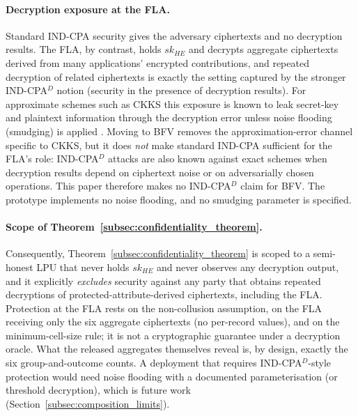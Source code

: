 \documentclass[a4paper,fleqn]{cas-dc}
\begin{document}
{\label{subsec:ind_cpa_d} \paragraph{Decryption exposure at the FLA.} Standard IND-CPA security gives the adversary ciphertexts and no decryption results. The FLA, by contrast, holds $sk_{HE}$ and decrypts aggregate ciphertexts derived from many applications' encrypted contributions, and repeated decryption of related ciphertexts is exactly the setting captured by the stronger IND-CPA$^{D}$ notion (security in the presence of decryption results). For approximate schemes such as CKKS this exposure is known to leak secret-key and plaintext information through the decryption error unless noise flooding (smudging) is applied \citep{limicciancio2021approximate}. Moving to BFV removes the approximation-error channel specific to CKKS, but it does \emph{not} make standard IND-CPA sufficient for the FLA's role: IND-CPA$^{D}$ attacks are also known against exact schemes when decryption results depend on ciphertext noise or on adversarially chosen operations. This paper therefore makes no IND-CPA$^{D}$ claim for BFV. The prototype implements no noise flooding, and no smudging parameter is specified.

\paragraph{Scope of Theorem~\ref{subsec:confidentiality_theorem}.} Consequently, Theorem~\ref{subsec:confidentiality_theorem} is scoped to a semi-honest LPU that never holds $sk_{HE}$ and never observes any decryption output, and it explicitly \emph{excludes} security against any party that obtains repeated decryptions of protected-attribute-derived ciphertexts, including the FLA. Protection at the FLA rests on the non-collusion assumption, on the FLA receiving only the six aggregate ciphertexts (no per-record values), and on the minimum-cell-size rule; it is not a cryptographic guarantee under a decryption oracle. What the released aggregates themselves reveal is, by design, exactly the six group-and-outcome counts. A deployment that requires IND-CPA$^{D}$-style protection would need noise flooding with a documented parameterisation (or threshold decryption), which is future work (Section~\ref{subsec:composition_limits}).

}
\end{document}
